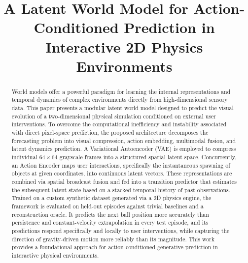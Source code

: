 \documentclass[conference]{IEEEtran}
\begin{document}
\title{A Latent World Model for Action-Conditioned Prediction in Interactive 2D Physics Environments}

\author{
\and
{}
\and
{}
\and
{}
}

\maketitle

\begin{abstract}
World models offer a powerful paradigm for learning the internal representations and temporal dynamics of complex environments directly from high-dimensional sensory data. This paper presents a modular latent world model designed to predict the visual evolution of a two-dimensional physical simulation conditioned on external user interventions. To overcome the computational inefficiency and instability associated with direct pixel-space prediction, the proposed architecture decomposes the forecasting problem into visual compression, action embedding, multimodal fusion, and latent dynamics prediction. A Variational Autoencoder (VAE) is employed to compress individual $64 \times 64$ grayscale frames into a structured spatial latent space. Concurrently, an Action Encoder maps user interactions, specifically the instantaneous spawning of objects at given coordinates, into continuous latent vectors. These representations are combined via spatial broadcast fusion and fed into a transition predictor that estimates the subsequent latent state based on a stacked temporal history of past observations. Trained on a custom synthetic dataset generated via a 2D physics engine, the framework is evaluated on held-out episodes against trivial baselines and a reconstruction oracle. It predicts the next ball position more accurately than persistence and constant-velocity extrapolation in every test episode, and its predictions respond specifically and locally to user interventions, while capturing the direction of gravity-driven motion more reliably than its magnitude. This work provides a foundational approach for action-conditioned generative prediction in interactive physical environments.
\end{abstract}
\end{document}
